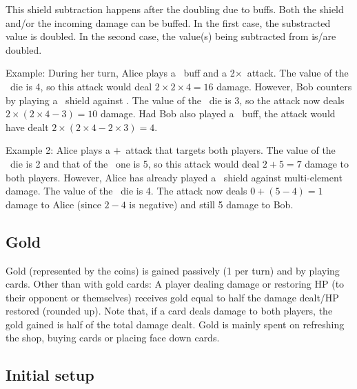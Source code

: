 \documentclass[dvipsnames,parskip,a4paper]{scrartcl}
\newcommand{\iconsize}{3.4mm}
\newcommand{\icondepth}{0.45mm}
\newcommand{\icon}[1]{\raisebox{-\icondepth}{\texttt{[image:  \#1 ]}}}
\newcommand{\fire}{\icon{icons/fire.png}}
\newcommand{\earth}{\icon{icons/earth.png}}
\newcommand{\water}{\icon{icons/water.png}}
\newcommand{\magic}{\icon{icons/magic.png}}
\begin{document}
\vspace{4pt}

This shield subtraction happens after the doubling due to buffs. Both the shield and/or the incoming damage can be buffed. In the first case, the substracted value is doubled. In the second case, the value(s) being subtracted from is/are doubled.

\vspace{4pt}

Example: During her turn, Alice plays a \fire \ buff and a 2\hspace{1pt}$\times$\hspace{1pt}\fire \ attack. The value of the \fire \ die is 4, so this attack would deal $2 \times 2 \times 4 = 16$ damage. However, Bob counters by playing a \water \ shield against \fire. The value of the \water \ die is 3, so the attack now deals $2 \times (2 \times 4 - 3) = 10$ damage. Had Bob also played a \water \ buff, the attack would have dealt $2 \times (2 \times 4 - 2 \times 3) = 4$.

\vspace{4pt}

Example 2: Alice plays a \water\hspace{1pt}$+$\hspace{1pt}\earth \ attack that targets both players. The value of the \water \ die is 2 and that of the \earth \ one is 5, so this attack would deal $2 + 5 = 7$ damage to both players. However, Alice has already played a \magic \ shield against multi-element damage. The value of the \magic \ die is 4. The attack now deals $0 + (5 - 4) = 1$ damage to Alice (since $2 - 4$ is negative) and still 5 damage to Bob.

\subsection*{Gold}

Gold (represented by the coins) is gained passively (1 per turn) and by playing cards. Other than with gold cards: A player dealing damage or restoring HP (to their opponent or themselves) receives gold equal to half the damage dealt/HP restored (rounded up). Note that, if a card deals damage to both players, the gold gained is half of the total damage dealt. Gold is mainly spent on refreshing the shop, buying cards or placing face down cards.

\subsection*{Initial setup}
\end{document}
